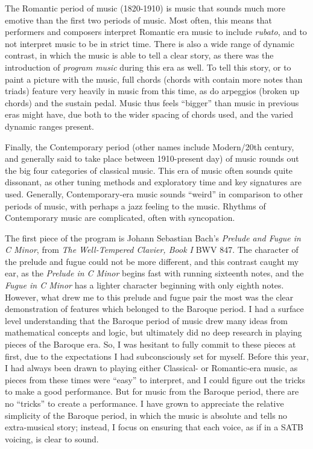 The Romantic period of music (1820-1910) is music that sounds much more emotive than the first two periods of music. Most often, this means that performers and composers interpret Romantic era music to include \textit{rubato}, and to not interpret music to be in strict time. There is also a wide range of dynamic contrast, in which the music is able to tell a clear story, as there was the introduction of \textit{program music} during this era as well. To tell this story, or to paint a picture with the music, full chords (chords with contain more notes than triads) feature very heavily in music from this time, as do arpeggios (broken up chords) and the sustain pedal. Music thus feels ``bigger'' than music in previous eras might have, due both to the wider spacing of chords used, and the varied dynamic ranges present. 

Finally, the Contemporary period (other names include Modern/20th century, and generally said to take place between 1910-present day) of music rounds out the big four categories of classical music. This era of music often sounds quite dissonant, as other tuning methods and exploratory time and key signatures are used. Generally, Contemporary-era music sounds ``weird'' in comparison to other periods of music, with perhaps a jazz feeling to the music. Rhythms of Contemporary music are complicated, often with syncopation. 

The first piece of the program is Johann Sebastian Bach's \textit{Prelude and Fugue in C Minor}, from \textit{The Well-Tempered Clavier, Book I} BWV 847. The character of the prelude and fugue could not be more different, and this contrast caught my ear, as the \textit{Prelude in C Minor} begins fast with running sixteenth notes, and the \textit{Fugue in C Minor} has a lighter character beginning with only eighth notes. However, what drew me to this prelude and fugue pair the most was the clear demonstration of features which belonged to the Baroque period. I had a surface level understanding that the Baroque period of music drew many ideas from mathematical concepts and logic, but ultimately did no deep research in playing pieces of the Baroque era. So, I was hesitant to fully commit to these pieces at first, due to the expectations I had subconsciously set for myself. Before this year, I had always been drawn to playing either Classical- or Romantic-era music, as pieces from these times were ``easy'' to interpret, and I could figure out the tricks to make a good performance. But for music from the Baroque period, there are no ``tricks'' to create a performance. I have grown to appreciate the relative simplicity of the Baroque period, in which the music is absolute and tells no extra-musical story; instead, I focus on ensuring that each voice, as if in a SATB voicing, is clear to sound.

